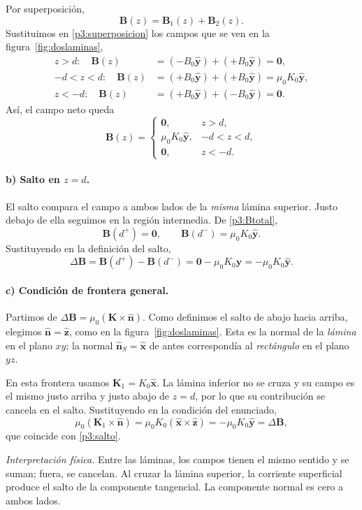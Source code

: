 \documentclass[11pt]{article}
\newcommand{\ex}{\hat{\mathbf{x}}}
\newcommand{\ey}{\hat{\mathbf{y}}}
\newcommand{\ez}{\hat{\mathbf{z}}}
\newcommand{\ideafisica}[1]{%
  \par\medskip\noindent\textit{Interpretación física.} #1\par}
\begin{document}
Por superposición,
\begin{equation}
  \mathbf B(z)=\mathbf B_1(z)+\mathbf B_2(z).
  \label{p3:superposicion}
\end{equation}
Sustituimos en \eqref{p3:superposicion} los campos que se ven
en la figura~\ref{fig:doslaminas},
\begin{align*}
  z>d:\quad
  \mathbf B(z)&=(-B_0\ey)+(+B_0\ey)=\mathbf 0,\\[3pt]
  -d<z<d:\quad
  \mathbf B(z)&=(+B_0\ey)+(+B_0\ey)=\mu_0 K_0\ey,\\[3pt]
  z<-d:\quad
  \mathbf B(z)&=(+B_0\ey)+(-B_0\ey)=\mathbf 0.
\end{align*}
Así, el campo neto queda
\begin{equation}
  \boxed{
    \mathbf B(z)=
    \begin{cases}
      \mathbf0,&z>d,\\[3pt]
      \mu_0K_0\ey,&-d<z<d,\\[3pt]
      \mathbf0,&z<-d.
    \end{cases}
  }
  \label{p3:Btotal}
\end{equation}

\paragraph{b) Salto en $z=d$.}
El salto compara el campo a ambos lados de la \emph{misma} lámina
superior. Justo debajo de ella seguimos en la región intermedia.
De \eqref{p3:Btotal},
\[
  \mathbf B(d^+)=\mathbf0,
  \qquad \mathbf B(d^-)=\mu_0K_0\ey.
\]
Sustituyendo en la definición del salto,
\begin{equation}
  \Delta\mathbf B
    =\mathbf B(d^+)-\mathbf B(d^-)
    =\mathbf0-\mu_0K_0\ey
    =-\mu_0K_0\ey.
  \label{p3:salto}
\end{equation}

\paragraph{c) Condición de frontera general.}
Partimos de $\Delta\mathbf B=\mu_0(\mathbf K\times\hat{\mathbf n})$.
Como definimos el salto de abajo hacia arriba, elegimos
$\hat{\mathbf n}=\ez$, como en la figura~\ref{fig:doslaminas}.
Esta es la normal de la \emph{lámina} en el plano $xy$; la normal
$\hat{\mathbf n}_S=\ex$ de antes correspondía al \emph{rectángulo}
en el plano $yz$.

En esta frontera usamos $\mathbf K_1=K_0\ex$. La lámina inferior
no se cruza y su campo es el mismo justo arriba y justo abajo de
$z=d$, por lo que su contribución se cancela en el salto.
Sustituyendo en la condición del enunciado,
\[
  \mu_0(\mathbf K_1\times\hat{\mathbf n})
    =\mu_0K_0(\ex\times\ez)
    =-\mu_0K_0\ey
    =\Delta\mathbf B,
\]
que coincide con \eqref{p3:salto}.
\ideafisica{Entre las láminas, los campos tienen el mismo sentido
y se suman; fuera, se cancelan. Al cruzar la lámina superior,
la corriente superficial produce el salto de la componente
tangencial. La componente normal es cero a ambos lados.}
\end{document}
